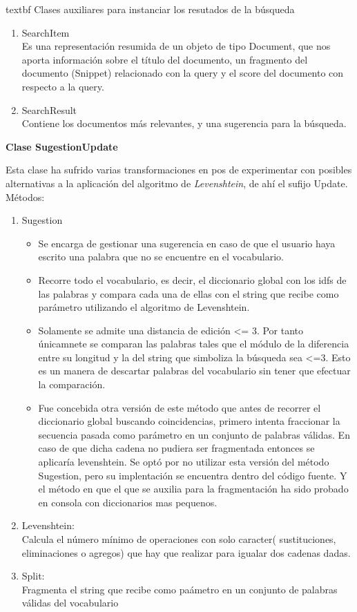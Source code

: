 \documentclass[12pt]{article}
\begin{document}
  textbf{ Clases auxiliares para instanciar los resutados de la b\'usqueda}
 \begin{enumerate}
 \item SearchItem \\
 Es una representaci\'on resumida de un objeto de tipo Document, que nos aporta informaci\'on sobre el t\'itulo del documento, un fragmento del documento (Snippet) relacionado con la query y el score del documento con respecto a la query.

 \item SearchResult  \\
  Contiene los documentos m\'as relevantes, y una sugerencia para la b\'usqueda.
  \end{enumerate}


 \textbf{ Clase SugestionUpdate }

Esta clase ha sufrido varias transformaciones en pos de experimentar con posibles alternativas a la aplicación del algoritmo de \textit{ Levenshtein}, de ah\'i el sufijo Update. 
M\'etodos:
\begin{enumerate}
\item Sugestion
\begin{itemize}
\item Se encarga de gestionar una sugerencia en caso de que el usuario haya escrito una palabra que no se encuentre en el vocabulario.

\item Recorre todo el vocabulario, es decir, el diccionario global con los idfs de las palabras y compara cada una de ellas con el string que recibe como par\'ametro utilizando el algoritmo de Levenshtein. 

\item Solamente se admite una distancia de edici\'on <= 3. Por tanto \'unicamnete se comparan las palabras tales que el m\'odulo de la diferencia entre su longitud y la del string que simboliza la b\'usqueda sea <=3.  Esto es un manera de descartar palabras del vocabulario sin tener que efectuar la comparaci\'on.

\item Fue concebida otra versi\'on de este m\'etodo que antes de recorrer el diccionario global buscando coincidencias, primero intenta fraccionar la secuencia pasada como par\'ametro en un conjunto de palabras v\'alidas. En caso de que dicha cadena no pudiera ser fragmentada entonces se aplicar\'ia levenshtein.
Se opt\'o por no utilizar esta versi\'on del m\'etodo Sugestion, pero su implentaci\'on se encuentra dentro del c\'odigo fuente. Y el m\'etodo en que el que se auxilia para la fragmentaci\'on ha sido probado en consola con diccionarios mas pequenos.
\end{itemize}

\item Levenshtein: \\
Calcula el n\'umero m\'inimo de operaciones con solo caracter( sustituciones, eliminaciones o agregos) que hay que realizar para igualar dos cadenas dadas.
\item  Split: \\
Fragmenta el string que recibe como pa\'ametro en un conjunto de palabras v\'alidas del vocabulario
\end{enumerate}
\end{document}
